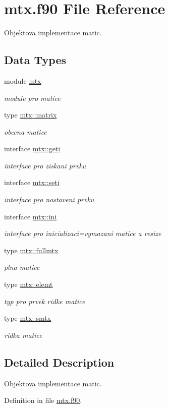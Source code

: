\hypertarget{mtx_8f90}{\section{mtx.\-f90 \-File \-Reference}
\label{mtx_8f90}
}


\-Objektova implementace matic.  


\subsection*{\-Data \-Types}
\begin{DoxyCompactItemize}
\item 
module \hyperlink{classmtx}{mtx}
\begin{DoxyCompactList}\small\item\em module pro matice \end{DoxyCompactList}\item 
type \hyperlink{structmtx_1_1matrix}{mtx\-::matrix}
\begin{DoxyCompactList}\small\item\em obecna matice \end{DoxyCompactList}\item 
interface \hyperlink{interfacemtx_1_1geti}{mtx\-::geti}
\begin{DoxyCompactList}\small\item\em interface pro ziskani prvku \end{DoxyCompactList}\item 
interface \hyperlink{interfacemtx_1_1seti}{mtx\-::seti}
\begin{DoxyCompactList}\small\item\em interface pro nastaveni prvku \end{DoxyCompactList}\item 
interface \hyperlink{interfacemtx_1_1ini}{mtx\-::ini}
\begin{DoxyCompactList}\small\item\em interface pro inicializaci=vymazani matice a resize \end{DoxyCompactList}\item 
type \hyperlink{structmtx_1_1fullmtx}{mtx\-::fullmtx}
\begin{DoxyCompactList}\small\item\em plna matice \end{DoxyCompactList}\item 
type \hyperlink{structmtx_1_1elemt}{mtx\-::elemt}
\begin{DoxyCompactList}\small\item\em typ pro prvek ridke matice \end{DoxyCompactList}\item 
type \hyperlink{structmtx_1_1smtx}{mtx\-::smtx}
\begin{DoxyCompactList}\small\item\em ridka matice \end{DoxyCompactList}\end{DoxyCompactItemize}


\subsection{\-Detailed \-Description}
\-Objektova implementace matic. 

\-Definition in file \hyperlink{mtx_8f90_source}{mtx.\-f90}.

